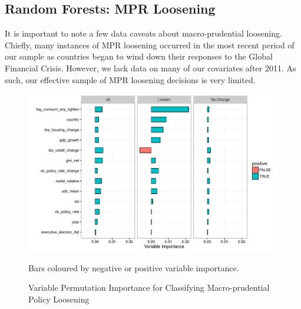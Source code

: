 \documentclass[]{article}
\begin{document}
\subsection{Random Forests: MPR
Loosening}\label{random-forests-mpr-loosening}

It is important to note a few data caveats about macro-prudential
loosening. Chiefly, many instances of MPR loosening occurred in the most
recent period of our sample as countries began to wind down their
responses to the Global Financial Crisis. However, we lack data on many
of our covariates after 2011. As such, our effective sample of MPR
loosening decisions is very limited.

\begin{figure}
    \caption{Variable Permutation Importance for Classifying Macro-prudential Policy Loosening}
    \label{imp_tighten}
    \begin{center}
        \includegraphics{figures/loosen_imp.pdf}
    \end{center}

    {\scriptsize{Bars coloured by negative or positive variable importance.}}

\end{figure}
\end{document}
